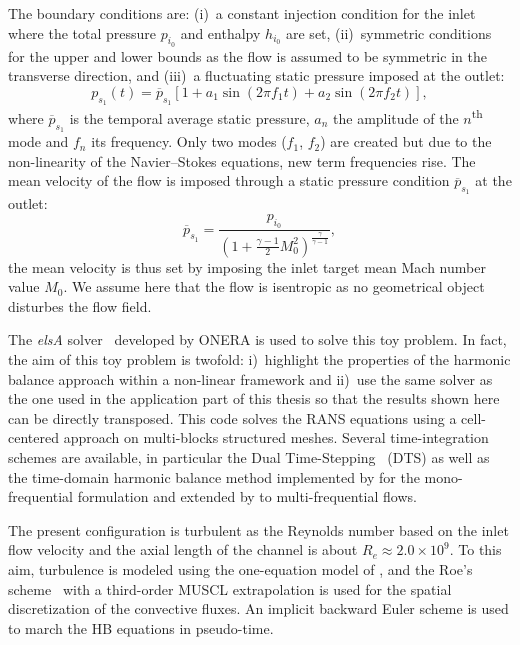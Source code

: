 The boundary conditions are: (i)~a constant injection condition for the inlet
where the total pressure $p_{i_0}$ and enthalpy $h_{i_0}$ are set,
(ii)~symmetric conditions for the upper and lower bounds as the flow
is assumed to be symmetric in the transverse direction, and (iii)~a
fluctuating static pressure imposed at the outlet:
\begin{equation}
  p_{s_1}(t) = \overline{p}_{s_1} \left[1 + a_1 \sin(2 \pi f_1 t) +
    a_2 \sin(2 \pi f_2 t) \right],
  \label{eq:outlet_canal}
\end{equation}
where $\overline{p}_{s_1}$ is the temporal average static pressure, $a_n$ the
amplitude of the $n$\textsuperscript{th} mode and $f_n$ its
frequency. Only two modes ($f_1$, $f_2$) are created
but due to the non-linearity of the Navier--Stokes equations,
new term frequencies rise.
The mean velocity of the flow is imposed through a
static pressure condition $\overline{p}_{s_1}$ at the outlet:
\begin{equation}
    \overline{p}_{s_1} = \frac{p_{i_0}}{\left(1 + 
    \frac{\gamma - 1}{2} M_{0}^2 \right) ^ {\frac{\gamma}{ \gamma - 1}}} ,
\end{equation}
the mean velocity is thus set by imposing the
inlet target mean Mach number value $M_{0}$.
We assume here that the flow is isentropic as no
geometrical object disturbes the flow field.

The \emph{elsA} solver~\cite{Cambier2013} developed by ONERA
is used to solve this toy problem. In fact, 
the aim of this toy problem is 
twofold: i)~highlight the properties of the harmonic balance
approach within a non-linear framework 
and ii)~use the same
solver as the one used in the application part of this
thesis so that the results shown here can be directly
transposed. 
This code solves the RANS equations using a cell-centered
approach on multi-blocks structured meshes.
Several time-integration schemes
are available, in particular the Dual Time-Stepping~\cite{Jameson1981} (DTS)
as well as the time-domain harmonic 
balance method implemented by \citet{JSicot2008} for the mono-frequential
formulation and extended by \citet{JGuedeney2013} to multi-frequential flows. 


The present configuration is turbulent as the Reynolds number based on the
inlet flow velocity and the axial length of the channel is about $R_e
\approx 2.0 \times 10^9$. To this aim, turbulence is modeled using the
one-equation model of \citet{Spalart1992}, and the
Roe's scheme~\cite{Roe1981} with a third-order MUSCL extrapolation 
is used for the spatial discretization of
the convective fluxes. An implicit backward Euler scheme is used
to march the HB equations in pseudo-time.



